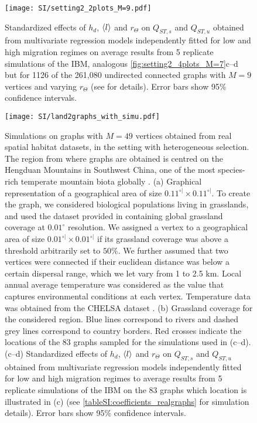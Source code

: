 \begin{figure}[ht]
  \centerline{
      \texttt{[image: SI/setting2\_2plots\_M=9.pdf]} 
  }
  \caption{Standardized effects of $h_d$, $\langle l \rangle$ and $r_\Theta$ on $Q_{ST,s}$ and $Q_{ST,u}$ obtained from multivariate regression models independently fitted for low and high migration regimes on average results from 5 replicate simulations of the IBM, analogous \cref{fig:setting2_4plots_M=7}c--d but for 1126 of the 261,080 undirected connected graphs with $M=9$ vertices and varying $r_\Theta$ (see  for details). Error bars show 95\% confidence intervals.
}
  \label{figSI:setting2_2plots_M=9}
\end{figure}

\begin{figure}[!ht]
  \centerline{
      \texttt{[image: SI/land2graphs\_with\_simu.pdf]} 
  }
  \caption{\small Simulations on graphs with $M=49$ vertices obtained from real spatial habitat datasets, in the setting with heterogeneous selection. The region from where graphs are obtained is centred on the Hengduan Mountains in Southwest China, one of the most species-rich temperate mountain biota globally \citep{Ding2020a}.
  (a) Graphical representation of a geographical area of size $ 0.11^{\circ|} \times 0.11^{\circ|}$. To create the graph, we considered biological populations living in grasslands, and used the dataset provided in \citep{Jung2020} containing global grassland coverage at $0.01^\circ$ resolution. We assigned a vertex to a geographical area of size $ 0.01^{\circ|} \times 0.01^{\circ|}$ if its grassland coverage was above a threshold arbitrarily set to $50\%$. We further assumed that two vertices were connected if their euclidean distance was below a certain dispersal range, which we let vary from 1 to 2.5 km. Local annual average temperature was considered as the value that captures environmental conditions at each vertex. Temperature data was obtained from the CHELSA dataset \citep{Karger2017}.
  (b) Grassland coverage for the considered region. Blue lines correspond to rivers and dashed grey lines correspond to country borders. Red crosses indicate the locations of the 83 graphs sampled for the simulations used in (c--d).
  (c--d) Standardized effects of $h_d$, $\langle l \rangle$ and $r_\Theta$ on $Q_{ST,s}$ and $Q_{ST,u}$ obtained from multivariate regression models independently fitted for low and high migration regimes to average results from 5 replicate simulations of the IBM on the 83 graphs which location is illustrated in (c) (see \cref{tableSI:coefficients_realgraphs} for simulation details). Error bars show 95\% confidence intervals.}
  \label{figSI:graph_real_land}
\end{figure}

